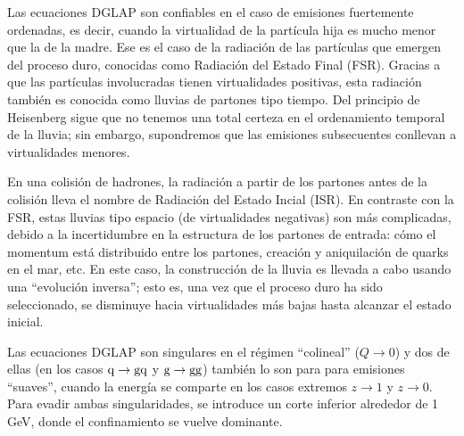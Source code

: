 Las ecuaciones DGLAP son confiables en el caso de emisiones fuertemente ordenadas, es decir, cuando la virtualidad de la partícula hija es mucho menor que la de la madre. Ese es el caso de la radiación de las partículas que emergen del proceso duro, conocidas como Radiación del Estado Final (FSR). Gracias a que las partículas involucradas tienen virtualidades positivas, esta radiación también es conocida como lluvias de partones tipo tiempo. Del principio de Heisenberg sigue que no tenemos una total certeza en el ordenamiento temporal de la lluvia; sin embargo, supondremos que las emisiones subsecuentes conllevan a virtualidades menores.

En una colisión de hadrones, la radiación a partir de los partones antes de la colisión lleva el nombre de Radiación del Estado Incial (ISR). En contraste con la FSR, estas lluvias tipo espacio (de virtualidades negativas) son más complicadas, debido a la incertidumbre en la estructura de los partones de entrada: cómo el momentum está distribuido entre los partones, creación y aniquilación de quarks en el mar, etc. En este caso, la construcción de la lluvia es llevada a cabo usando una ``evolución inversa''; esto es, una vez que el proceso duro ha sido seleccionado, se disminuye hacia virtualidades más bajas hasta alcanzar el estado inicial.

Las ecuaciones DGLAP son singulares en el régimen ``colineal'' ($Q\to0$) y dos de ellas (en los casos ${\mathrm q}\to{\mathrm g}{\mathrm q}$ y ${\mathrm g}\to{\mathrm g}{\mathrm g}$) también lo son para para emisiones ``suaves'', cuando la energía se comparte en los casos extremos $z\to1$ y $z\to0$. Para evadir ambas singularidades, se introduce un corte inferior alrededor de 1 GeV, donde el confinamiento se vuelve dominante.

